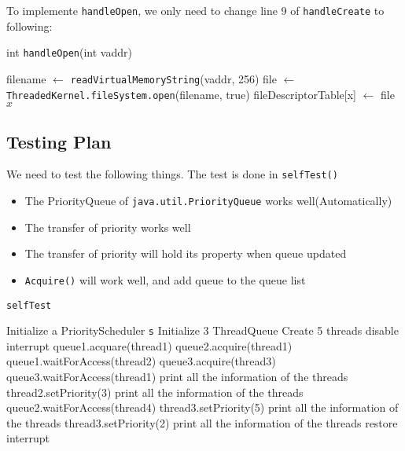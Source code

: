 \documentclass{article}
\begin{document}
\begin{spacing}{1.1}
To implemente \texttt{handleOpen}, we only need to change line 9 of \texttt{handleCreate} to following:
\begin{algorithm}
  \caption{int \texttt{handleOpen}(int vaddr)}
\begin{algorithmic}[1]
  \ENDIF
  \STATE filename $\leftarrow$ \texttt{readVirtualMemoryString}(vaddr, 256)
  \ENDIF
    \STATE \colorbox{myyellow}{file $\leftarrow$ \texttt{ThreadedKernel.fileSystem.open}(filename, true)}
    \STATE fileDescriptorTable[x] $\leftarrow$ file
    \RETURN $x$
  \ELSE
  \ENDIF 
\end{algorithmic}
\end{algorithm}

\subsection{Testing Plan}
We need to test the following things. The test is done in \texttt{selfTest()}
\begin{itemize}
\item The PriorityQueue of \texttt{java.util.PriorityQueue} works well(Automatically)
\item The transfer of priority works well
\item The transfer of priority will hold its property when queue updated
\item \texttt{Acquire()} will work well, and add queue to the queue list
\end{itemize}

\begin{algorithm}
  \caption{\texttt{selfTest}}
\begin{algorithmic}[1]
  \STATE Initialize a PriorityScheduler \texttt{s}
  \STATE Initialize 3 ThreadQueue
  \STATE Create 5 threads
  \STATE disable interrupt
  \STATE
  \STATE queue1.acquare(thread1)
  \STATE queue2.acquire(thread1)
  \STATE queue1.waitForAccess(thread2)
  \STATE queue3.acquire(thread3)
  \STATE queue3.waitForAccess(thread1)
  \STATE print all the information of the threads
  \STATE
  \STATE thread2.setPriority(3)
  \STATE print all the information of the threads
  \STATE
  \STATE queue2.waitForAccess(thread4)
  \STATE thread3.setPriority(5)
  \STATE print all the information of the threads
  \STATE
  \STATE thread3.setPriority(2)
  \STATE print all the information of the threads
  \STATE
  \STATE restore interrupt
\end{algorithmic}
\end{algorithm}


\end{spacing}
\end{document}
